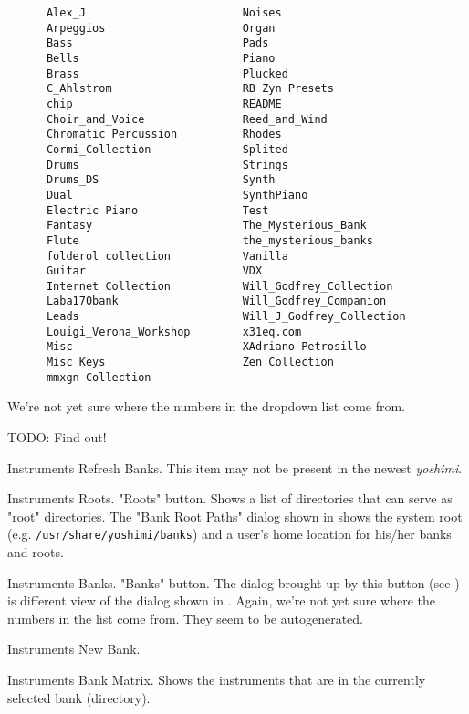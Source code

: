    \begin{verbatim}
      Alex_J                        Noises
      Arpeggios                     Organ
      Bass                          Pads
      Bells                         Piano
      Brass                         Plucked
      C_Ahlstrom                    RB Zyn Presets
      chip                          README
      Choir_and_Voice               Reed_and_Wind
      Chromatic Percussion          Rhodes
      Cormi_Collection              Splited
      Drums                         Strings
      Drums_DS                      Synth
      Dual                          SynthPiano
      Electric Piano                Test
      Fantasy                       The_Mysterious_Bank
      Flute                         the_mysterious_banks
      folderol collection           Vanilla
      Guitar                        VDX
      Internet Collection           Will_Godfrey_Collection
      Laba170bank                   Will_Godfrey_Companion
      Leads                         Will_J_Godfrey_Collection
      Louigi_Verona_Workshop        x31eq.com
      Misc                          XAdriano Petrosillo
      Misc Keys                     Zen Collection
      mmxgn Collection
   \end{verbatim}

   We're not yet sure where the numbers in the dropdown list come from.

   TODO:  Find out!

   Instruments Refresh Banks.
   This item may not be present in the newest \textsl{yoshimi}.

   Instruments Roots.
   "Roots" button.
   Shows a list of directories that can serve as "root" directories.
   The "Bank Root Paths" dialog shown in
    shows
   the system root (e.g. \texttt{/usr/share/yoshimi/banks}) and
   a user's home location for his/her banks and roots.

   Instruments Banks.
   "Banks" button.
   The dialog brought up by this button
   (see )
   is different view of the dialog shown in
   .
   Again, we're not yet sure where the numbers in the list come from.
   They seem to be autogenerated.

   Instruments New Bank.

   Instruments Bank Matrix.
   Shows the instruments that are in the currently selected bank
   (directory).

